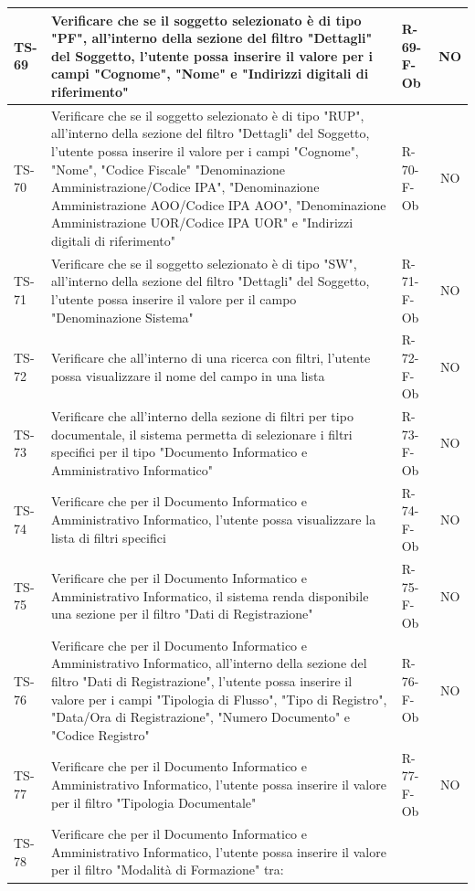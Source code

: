 \documentclass[a4paper,12pt]{article}
\begin{document}
\begin{longtable}{|p{1.5cm}|p{8.3cm}|p{2.4cm}|c|}
\hline
TS-69 & Verificare che se il soggetto selezionato è di tipo "PF", all'interno della sezione del filtro "Dettagli" del Soggetto, l'utente possa inserire il valore per i campi "Cognome", "Nome" e "Indirizzi digitali di riferimento" & R-69-F-Ob & NO \\
\hline
TS-70 & Verificare che se il soggetto selezionato è di tipo "RUP", all'interno della sezione del filtro "Dettagli" del Soggetto, l'utente possa inserire il valore per i campi "Cognome", "Nome", "Codice Fiscale" "Denominazione Amministrazione/Codice IPA", "Denominazione Amministrazione AOO/Codice IPA AOO", "Denominazione Amministrazione UOR/Codice IPA UOR" e "Indirizzi digitali di riferimento" & R-70-F-Ob & NO \\
\hline
TS-71 & Verificare che se il soggetto selezionato è di tipo "SW", all'interno della sezione del filtro "Dettagli" del Soggetto, l'utente possa inserire il valore per il campo "Denominazione Sistema" & R-71-F-Ob & NO \\
\hline
TS-72 & Verificare che all'interno di una ricerca con filtri, l'utente possa visualizzare il nome del campo in una lista & R-72-F-Ob & NO \\
\hline
TS-73 & Verificare che all'interno della sezione di filtri per tipo documentale, il sistema permetta di selezionare i filtri specifici per il tipo "Documento Informatico e Amministrativo Informatico" & R-73-F-Ob & NO \\
\hline
TS-74 & Verificare che per il Documento Informatico e Amministrativo Informatico, l'utente possa visualizzare la lista di filtri specifici & R-74-F-Ob & NO \\
\hline
TS-75 & Verificare che per il Documento Informatico e Amministrativo Informatico, il sistema renda disponibile una sezione per il filtro "Dati di Registrazione" & R-75-F-Ob & NO \\
\hline
TS-76 & Verificare che per il Documento Informatico e Amministrativo Informatico, all'interno della sezione del filtro "Dati di Registrazione", l'utente possa inserire il valore per i campi "Tipologia di Flusso", "Tipo di Registro", "Data/Ora di Registrazione", "Numero Documento" e "Codice Registro" & R-76-F-Ob & NO \\
\hline
TS-77 & Verificare che per il Documento Informatico e Amministrativo Informatico, l'utente possa inserire il valore per il filtro "Tipologia Documentale" & R-77-F-Ob & NO \\
\hline
TS-78 & Verificare che per il Documento Informatico e Amministrativo Informatico, l'utente possa inserire il valore per il filtro "Modalità di Formazione" tra:

\end{longtable}
\end{document}
